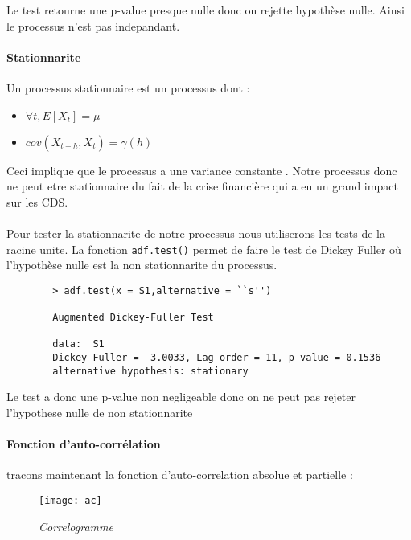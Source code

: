         Le test retourne une p-value presque nulle donc on rejette hypothèse nulle.
        Ainsi le processus n'est pas indepandant.

        \paragraph{Stationnarite}
        Un processus stationnaire est un processus dont :
        \begin{itemize}
            \item $\forall t,E[X_t]=\mu$  
            \item $cov(X_{t+h},X_t)=\gamma(h)$ 
        \end{itemize}
        Ceci implique que le processus a une variance constante .
        Notre processus donc ne peut etre stationnaire du fait de la crise
        financière qui a eu un grand impact sur les CDS. 

        \paragraph{} Pour tester la stationnarite de notre processus nous utiliserons les tests
        de la racine unite. 
        La fonction \verb+adf.test()+ permet de faire le test de Dickey Fuller
        où l'hypothèse nulle est la non stationnarite du processus.  
        \begin{verbatim}
        > adf.test(x = S1,alternative = ``s'')

        Augmented Dickey-Fuller Test

        data:  S1
        Dickey-Fuller = -3.0033, Lag order = 11, p-value = 0.1536
        alternative hypothesis: stationary
        \end{verbatim}

        Le test a donc une p-value non negligeable donc on ne peut pas rejeter
        l'hypothese nulle de non stationnarite 
        
        \paragraph{Fonction d'auto-corrélation} tracons maintenant la fonction
        d'auto-correlation absolue et partielle :
        \begin{figure}[H]
            \centering 
            \label{fig:ac} 
            \texttt{[image: ac]} 
            \caption{\it Correlogramme } 
        \end{figure} 


